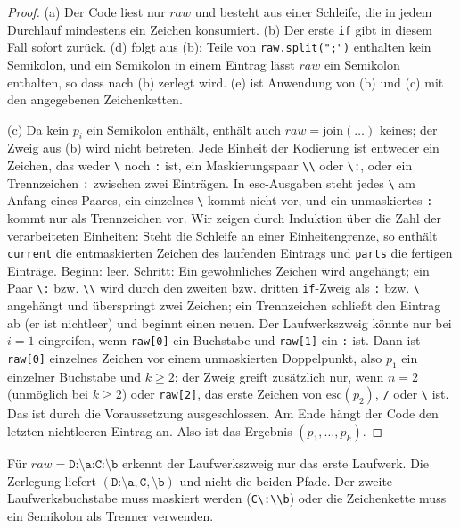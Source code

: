 \begin{proof}
	(a) Der Code liest nur $\mathit{raw}$ und besteht aus einer Schleife, die in jedem Durchlauf mindestens ein Zeichen konsumiert. (b) Der erste \texttt{if} gibt in diesem Fall sofort zurück. (d) folgt aus (b): Teile von \texttt{raw.split(";")} enthalten kein Semikolon, und ein Semikolon in einem Eintrag lässt $\mathit{raw}$ ein Semikolon enthalten, so dass nach (b) zerlegt wird. (e) ist Anwendung von (b) und (c) mit den angegebenen Zeichenketten.

	(c) Da kein $p_i$ ein Semikolon enthält, enthält auch $\mathit{raw}=\mathrm{join}(\ldots)$ keines; der Zweig aus (b) wird nicht betreten. Jede Einheit der Kodierung ist entweder ein Zeichen, das weder \texttt{\textbackslash} noch \texttt{:} ist, ein Maskierungspaar \texttt{\textbackslash\textbackslash} oder \texttt{\textbackslash:}, oder ein Trennzeichen \texttt{:} zwischen zwei Einträgen. In $\mathrm{esc}$-Ausgaben steht jedes \texttt{\textbackslash} am Anfang eines Paares, ein einzelnes \texttt{\textbackslash} kommt nicht vor, und ein unmaskiertes \texttt{:} kommt nur als Trennzeichen vor. Wir zeigen durch Induktion über die Zahl der verarbeiteten Einheiten: Steht die Schleife an einer Einheitengrenze, so enthält \texttt{current} die entmaskierten Zeichen des laufenden Eintrags und \texttt{parts} die fertigen Einträge. Beginn: leer. Schritt: Ein gewöhnliches Zeichen wird angehängt; ein Paar \texttt{\textbackslash:} bzw. \texttt{\textbackslash\textbackslash} wird durch den zweiten bzw. dritten \texttt{if}-Zweig als \texttt{:} bzw. \texttt{\textbackslash} angehängt und überspringt zwei Zeichen; ein Trennzeichen schließt den Eintrag ab (er ist nichtleer) und beginnt einen neuen. Der Laufwerkszweig könnte nur bei $i=1$ eingreifen, wenn \texttt{raw[0]} ein Buchstabe und \texttt{raw[1]} ein \texttt{:} ist. Dann ist \texttt{raw[0]} einzelnes Zeichen vor einem unmaskierten Doppelpunkt, also $p_1$ ein einzelner Buchstabe und $k\ge2$; der Zweig greift zusätzlich nur, wenn $n=2$ (unmöglich bei $k\ge2$) oder \texttt{raw[2]}, das erste Zeichen von $\mathrm{esc}(p_2)$, \texttt{/} oder \texttt{\textbackslash} ist. Das ist durch die Voraussetzung ausgeschlossen. Am Ende hängt der Code den letzten nichtleeren Eintrag an. Also ist das Ergebnis $(p_1,\ldots,p_k)$.
\end{proof}

\begin{beispiel}\label{bsp:zweilaufwerke}
	Für $\mathit{raw}=\texttt{D:\textbackslash a:C:\textbackslash b}$ erkennt der Laufwerkszweig nur das erste Laufwerk. Die Zerlegung liefert $(\texttt{D:\textbackslash a},\texttt{C},\texttt{\textbackslash b})$ und nicht die beiden Pfade. Der zweite Laufwerksbuchstabe muss maskiert werden (\texttt{C\textbackslash:\textbackslash\textbackslash b}) oder die Zeichenkette muss ein Semikolon als Trenner verwenden.
\end{beispiel}

